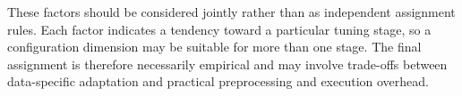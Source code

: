 These factors should be considered jointly rather than as independent assignment rules. Each factor indicates a tendency toward a particular tuning stage, so a configuration dimension may be suitable for more than one stage. The final assignment is therefore necessarily empirical and may involve trade-offs between data-specific adaptation and practical preprocessing and execution overhead.
